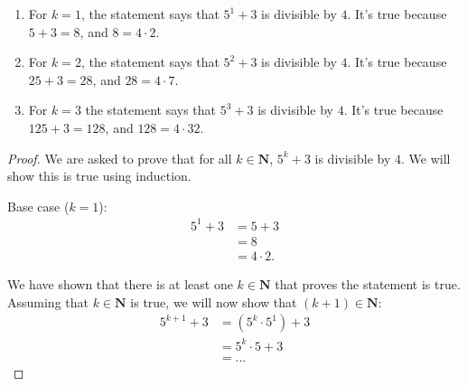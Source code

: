 \documentclass[12pt,oneside]{amsart}
\theoremstyle{remark}
\newcommand{\bfN}{\mathbf{N}}
\begin{document}
\begin{enumerate}
\item For $k=1$, the statement says that $5^1+3$ is divisible by $4$.
It's true because $5+3=8$, and $8 = 4 \cdot 2$.
\item For $k = 2$, the statement says that $5^2 + 3$ is divisible by $4$. It's true because $25 + 3 = 28$, and $28 = 4 \cdot 7$.
\item For $k = 3$ the statement says that $5^3 + 3$ is divisible by $4$. It's true because $125 + 3 = 128$, and $128 = 4 \cdot 32$.
\end{enumerate}
\begin{proof}
We are asked to prove that for all $k \in \bfN$, $5^k + 3$ is divisible by $4$. We will show this is true using induction.

Base case ($k = 1$):
\begin{align*}
5^1 + 3 &= 5 + 3 \\
          &= 8 \\
          &= 4 \cdot 2.
\end{align*}

We have shown that there is at least one $k \in \bfN$ that proves the statement is true. Assuming that $k \in \bfN$ is true, we will now show that $(k + 1) \in \bfN$:
\begin{align*}
5^{k + 1} + 3 &= (5^k \cdot 5^1) + 3 \\
              &= 5^k \cdot 5 + 3 \\
              &= ...
\end{align*}

\end{proof}
\end{document}
